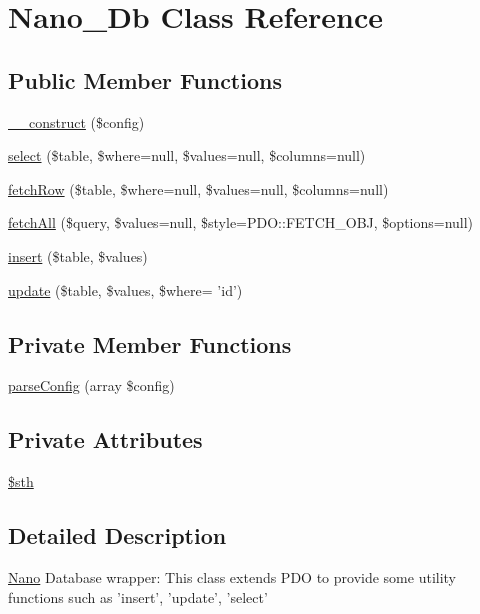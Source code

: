 \hypertarget{classNano__Db}{
\section{Nano\_\-Db Class Reference}
\label{classNano__Db}
}
\subsection*{Public Member Functions}
\begin{CompactItemize}
\item 
\hyperlink{classNano__Db_c1d07ff4d3efcc8488ea33e88a63b1aa}{\_\-\_\-construct} (\$config)
\item 
\hyperlink{classNano__Db_4fc2f55d6dc766b1a0ae47160d9de7e8}{select} (\$table, \$where=null, \$values=null, \$columns=null)
\item 
\hyperlink{classNano__Db_c1b16334752c17aac54b5e993b702062}{fetchRow} (\$table, \$where=null, \$values=null, \$columns=null)
\item 
\hyperlink{classNano__Db_c366221db547f0902a01e9e9b25de948}{fetchAll} (\$query, \$values=null, \$style=PDO::FETCH\_\-OBJ, \$options=null)
\item 
\hyperlink{classNano__Db_449280b23cb133a28b3dce201e3e994e}{insert} (\$table, \$values)
\item 
\hyperlink{classNano__Db_2bf5ecd008e9beb3536e6770a5707757}{update} (\$table, \$values, \$where= 'id')
\end{CompactItemize}
\subsection*{Private Member Functions}
\begin{CompactItemize}
\item 
\hyperlink{classNano__Db_a6265a626eb00824ebb6c775ffe7a9d8}{parseConfig} (array \$config)
\end{CompactItemize}
\subsection*{Private Attributes}
\begin{CompactItemize}
\item 
\hyperlink{classNano__Db_c4a2f87c3b66ceeb05b43b710b8c06f0}{\$sth}
\end{CompactItemize}


\subsection{Detailed Description}
\hyperlink{classNano}{Nano} Database wrapper: This class extends PDO to provide some utility functions such as 'insert', 'update', 'select'

